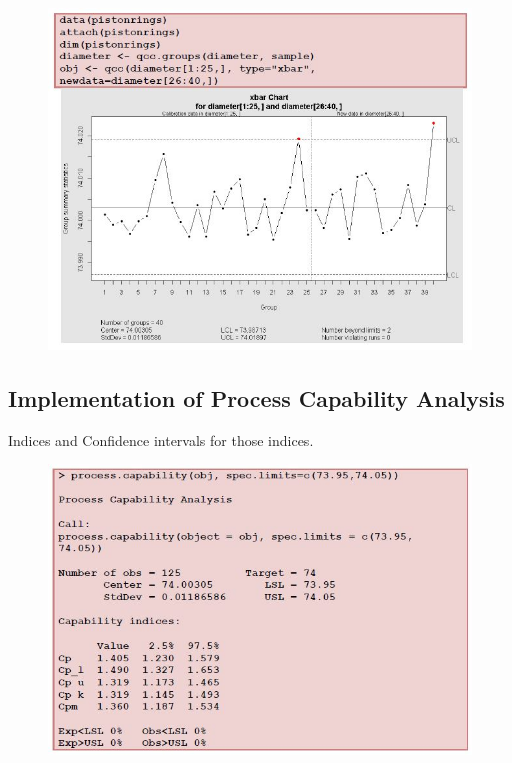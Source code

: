\documentclass[11pt]{article} %
\begin{document}
			\begin{figure}[h!]
				\centering
				\includegraphics[width=1.1\linewidth]{proccapindices/pistonrings}
			\end{figure}
			
			\newpage
			\subsection{Implementation of Process Capability Analysis}
			Indices and Confidence intervals for those indices.
			
			
\begin{figure}[h!]
\centering
\includegraphics[width=1.1\linewidth]{proccapindices/qccoutput}
\end{figure}
			
\end{document}
